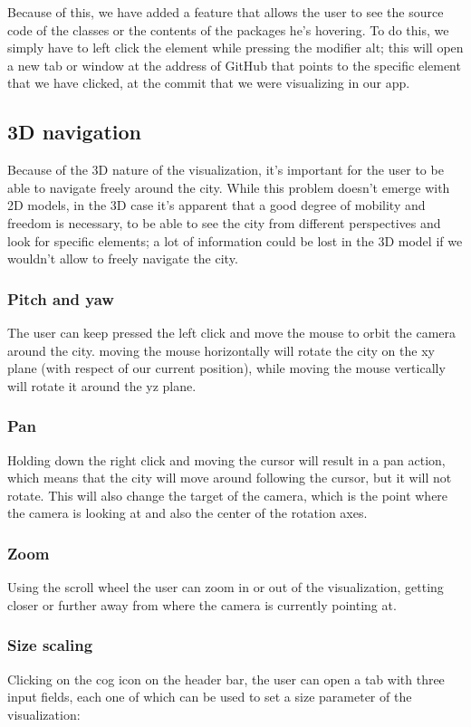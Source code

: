 \documentclass[]{usiinfbachelorproject}
\begin{document}
Because of this, we have added a feature that allows the user to see the source code of the classes or the contents of the packages he's hovering. To do this, we simply have to left click the element while pressing the modifier alt; this will open a new tab or window at the address of GitHub that points to the specific element that we have clicked, at the commit that we were visualizing in our app.

\subsection{3D navigation} \label{3D navigation}
Because of the 3D nature of the visualization, it's important for the user to be able to navigate freely around the city. While this problem doesn't emerge with 2D models, in the 3D case it's apparent that a good
degree of mobility and freedom is necessary, to be able to see the city from different perspectives and look for specific elements; a lot of information could be lost in the 3D model if we wouldn't allow to freely navigate the city.


\subsubsection{Pitch and yaw} \label{Pitch and yaw}
The user can keep pressed the left click and move the mouse to orbit the camera around the city. moving the mouse horizontally will rotate the city on the xy plane (with respect of our current position), while
moving the mouse vertically will rotate it around the yz plane.

\subsubsection{Pan} \label{Pan}
Holding down the right click and moving the cursor will result in a pan action, which means that the city will move around following the cursor, but it will not rotate. This will also change the target of the camera,
 which is the point where the camera is looking at and also the center of the rotation axes.

 \subsubsection{Zoom} \label{Zoom}
Using the scroll wheel the user can zoom in or out of the visualization, getting closer or further away from where the camera is currently pointing at.

\subsubsection{Size scaling} \label{Size scaling}
Clicking on the cog icon on the header bar, the user can open a tab with three input fields, each one of which can be used to set a size parameter of the visualization:
\end{document}
